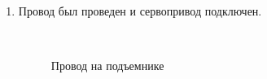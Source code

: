 \begin{enumerate}
\begin{enumerate}
		\item Провод был проведен и сервопривод подключен.
		\begin{figure}[H]
			\begin{minipage}[h]{0.2\linewidth}
				\center  
			\end{minipage}
			\begin{minipage}[h]{0.6\linewidth}
				\caption{Провод на подъемнике}
			\end{minipage}
		\end{figure}
		

\end{enumerate}
\end{enumerate}

